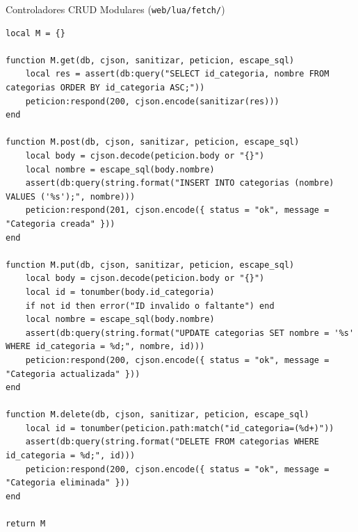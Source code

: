\documentclass[10pt,aspectratio=169]{beamer}
\begin{document}
\begin{frame}[fragile]{Controladores CRUD Modulares (\texttt{web/lua/fetch/})}
\begin{lstlisting}[style=luastyle, caption={Implementación de handlers CRUD en Lua}]
local M = {}

function M.get(db, cjson, sanitizar, peticion, escape_sql)
    local res = assert(db:query("SELECT id_categoria, nombre FROM categorias ORDER BY id_categoria ASC;"))
    peticion:respond(200, cjson.encode(sanitizar(res)))
end

function M.post(db, cjson, sanitizar, peticion, escape_sql)
    local body = cjson.decode(peticion.body or "{}")
    local nombre = escape_sql(body.nombre)
    assert(db:query(string.format("INSERT INTO categorias (nombre) VALUES ('%s');", nombre)))
    peticion:respond(201, cjson.encode({ status = "ok", message = "Categoria creada" }))
end

function M.put(db, cjson, sanitizar, peticion, escape_sql)
    local body = cjson.decode(peticion.body or "{}")
    local id = tonumber(body.id_categoria)
    if not id then error("ID invalido o faltante") end
    local nombre = escape_sql(body.nombre)
    assert(db:query(string.format("UPDATE categorias SET nombre = '%s' WHERE id_categoria = %d;", nombre, id)))
    peticion:respond(200, cjson.encode({ status = "ok", message = "Categoria actualizada" }))
end

function M.delete(db, cjson, sanitizar, peticion, escape_sql)
    local id = tonumber(peticion.path:match("id_categoria=(%d+)"))
    assert(db:query(string.format("DELETE FROM categorias WHERE id_categoria = %d;", id)))
    peticion:respond(200, cjson.encode({ status = "ok", message = "Categoria eliminada" }))
end

return M
\end{lstlisting}
\end{frame}
\end{document}
